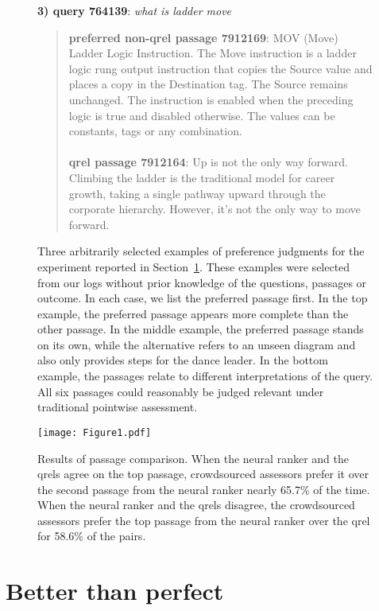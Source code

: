 \documentclass[fullpage]{article}
\begin{document}
\begin{figure}[t]
{\bf 3) query 764139}: {\em what is ladder move}\\
\begin{quote}
{\bf preferred non-qrel passage 7912169}:
MOV (Move) Ladder Logic Instruction. The Move instruction is a ladder logic rung output instruction that copies the Source value and places a copy in the Destination tag. The Source remains unchanged. The instruction is enabled when the preceding logic is true and disabled otherwise. The values can be constants, tags or any combination.\\
\\
{\bf qrel passage 7912164}:
Up is not the only way forward. Climbing the ladder is the traditional model for career growth, taking a single pathway upward through the corporate hierarchy. However, it's not the only way to move forward.\\
\end{quote}
\caption{
Three arbitrarily selected examples of preference judgments for the experiment reported in Section~\ref{sec:perfect}.
These examples were selected from our logs without prior knowledge of the questions,
passages or outcome.
In each case, we list the preferred passage first.
In the top example, the preferred passage appears more complete than the other passage.
In the middle example, the preferred passage stands on its own, while the alternative refers to an unseen diagram and also only provides steps for the dance leader.
In the bottom example, the passages relate to different interpretations of the query.
All six passages could reasonably be judged relevant under traditional pointwise
assessment.
}
\label{fig:eg}
\end{figure}

\begin{figure}[t]
  \centering
  \label{fig1}
  \texttt{[image: Figure1.pdf]}
  \caption{
Results of passage comparison. When the neural ranker and the qrels agree on the top passage, crowdsourced assessors prefer it over the second passage from the neural ranker nearly 65.7\% of the time. When the neural ranker and the qrels disagree, the crowdsourced assessors prefer the top passage from the neural ranker over the qrel for 58.6\% of the pairs.}
\label{fig:pref}
\end{figure}

\section{Better than perfect}
\label{sec:perfect}
\end{document}
